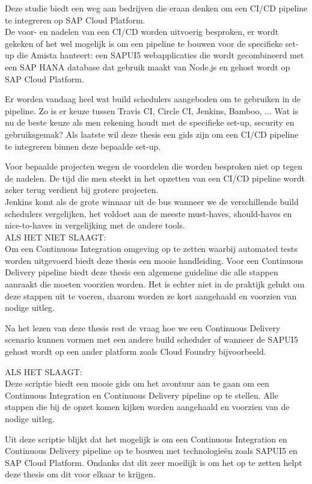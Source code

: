 Deze studie biedt een weg aan bedrijven die eraan denken om een CI/CD pipeline te integreren op SAP Cloud Platform. \\
De voor- en nadelen van een CI/CD worden uitvoerig besproken, er wordt gekeken of het wel mogelijk is om een pipeline te bouwen voor de specifieke set-up die Amista hanteert: een SAPUI5 webapplicaties die wordt gecombineerd met een SAP HANA database dat gebruik maakt van Node.js en gehost wordt op SAP Cloud Platform.

Er worden vandaag heel wat build schedulers aangeboden om te gebruiken in de pipeline. Zo is er keuze tussen Travis CI, Circle CI, Jenkins, Bamboo, ... Wat is nu de beste keuze als men rekening houdt met de specifieke set-up, security en gebruiksgemak?
Als laatste wil deze thesis een gids zijn om een CI/CD pipeline te integreren binnen deze bepaalde set-up.

Voor bepaalde projecten wegen de voordelen die worden besproken niet op tegen de nadelen. De tijd die men steekt in het opzetten van een CI/CD pipeline wordt zeker terug verdient bij grotere projecten.\\
Jenkins komt als de grote winnaar uit de bus wanneer we de verschillende build schedulers vergelijken, het voldoet aan de meeste must-haves, should-haves en nice-to-haves in vergelijking met de andere tools.\\
ALS HET NIET SLAAGT:\\
Om een Continuous Integration omgeving op te zetten waarbij automated tests worden uitgevoerd biedt deze thesis een mooie handleiding. 
Voor een Continuous Delivery pipeline biedt deze thesis een algemene guideline die alle stappen aanraakt die moeten voorzien worden. Het is echter niet in de praktijk gelukt om deze stappen uit te voeren, daarom worden ze kort aangehaald en voorzien van nodige uitleg.

Na het lezen van deze thesis rest de vraag hoe we een Continuous Delivery scenario kunnen vormen met een andere build scheduler of wanneer de SAPUI5 gehost wordt op een ander platform zoals Cloud Foundry bijvoorbeeld.

ALS HET SLAAGT:\\
Deze scriptie biedt een mooie gids om het avontuur aan te gaan om een Continuous Integration en Continuous Delivery pipeline op te stellen. Alle stappen die bij de opzet komen kijken worden aangehaald en voorzien van de nodige uitleg.

Uit deze scriptie blijkt dat het mogelijk is om een Continuous Integration en Continuous Delivery pipeline op te bouwen met technologieën zoals SAPUI5 en SAP Cloud Platform. Ondanks dat dit zeer moeilijk is om het op te zetten helpt deze thesis om dit voor elkaar te krijgen.
